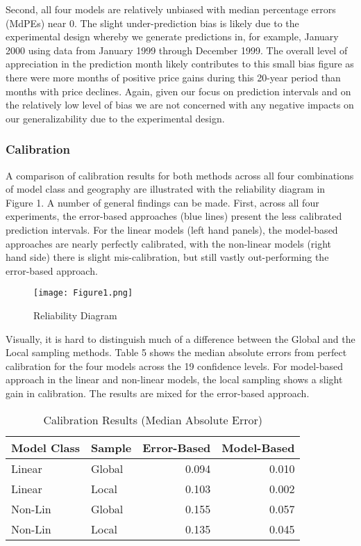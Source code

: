 \documentclass[colTwo]{format}
\theoremstyle{definition}
\begin{document}
Second, all four models are relatively unbiased with median percentage errors (MdPEs) near 0.  The slight under-prediction bias is likely due to the experimental design whereby we generate predictions in, for example, January 2000 using data from January 1999 through December 1999.  The overall level of appreciation in the prediction month likely contributes to this small bias figure as there were more months of positive price gains during this 20-year period than months with price declines.  Again, given our focus on prediction intervals and on the relatively low level of bias we are not concerned with any negative impacts on our generalizability due to the experimental design. 

\subsubsection{Calibration}

A comparison of calibration results for both methods across all four combinations of model class and geography are illustrated with the reliability diagram in Figure 1.  A number of general findings can be made.  First, across all four experiments, the error-based approaches (blue lines) present the less calibrated prediction intervals.  For the linear models (left hand panels), the model-based approaches are nearly perfectly calibrated, with the non-linear models (right hand side) there is slight mis-calibration, but still vastly out-performing the error-based approach.

\begin{figure}[h!]
\centering
\texttt{[image: Figure1.png]}
\caption{Reliability Diagram}
\label{fig:reliability}
\end{figure}

Visually, it is hard to distinguish much of a difference between the Global and the Local sampling methods.  Table 5 shows the median absolute errors from perfect calibration for the four models across the 19 confidence levels.  For model-based approach in the linear and non-linear models, the local sampling shows a slight gain in calibration.  The results are mixed for the error-based approach.

\begin{table}[h]
\centering
\begin{tabular}{l|l|r|r}
\hline
\textbf{Model Class} & \textbf{Sample} & \textbf{Error-Based} & \textbf{Model-Based}\\
\hline
Linear & Global & 0.094 & 0.010\\
Linear & Local & 0.103 & 0.002\\
\hline
Non-Lin & Global & 0.155 & 0.057\\
Non-Lin & Local & 0.135 & 0.045\\
\hline
\end{tabular}
\caption{Calibration Results (Median Absolute Error)}
\label{table:5}
\end{table}
\end{document}
